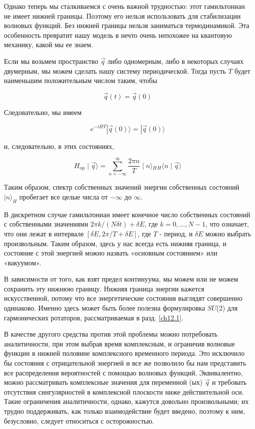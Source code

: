 \documentclass[main.tex]{subfiles}
\begin{document}
Однако теперь мы сталкиваемся с очень важной трудностью: этот гамильтониан не имеет нижней границы. Поэтому его нельзя использовать для стабилизации волновых функций. Без нижней границы нельзя заниматься термодинамикой. Эта особенность превратит нашу модель в нечто очень непохожее на квантовую механику, какой мы ее знаем.

Если мы возьмем пространство $\vec q$ либо одномерным, либо в некоторых случаях двумерным, мы можем сделать нашу систему периодической. Тогда пусть $T$ будет наименьшим положительным числом таким, чтобы

\begin{equation}\label{12.20}
	\vec q(t) = \vec q(0)
\end{equation}

Следовательно, мы имеем

\begin{equation}\label{12.21}
	e^{-i H T}|\vec{q}(0)\rangle=|\vec{q}(0)\rangle
\end{equation}
           
и, следовательно, в этих состояниях,

\begin{equation}\label{12.22}
H_{\mathrm{op}}\mid \vec q\rangle = \sum_{n=-\infty}^{\infty} \frac{2 \pi n}{T}\mid n\rangle{_H} {_H} \langle n \mid \vec{q}\rangle
\end{equation}

Таким образом, спектр собственных значений энергии собственных состояний $\mid n\rangle_H$ пробегает все целые числа от $-\infty$ до $\infty$.

В дискретном случае гамильтониан имеет конечное число собственных состояний с собственными значениями $2\pi k / (N\delta t) + \delta E$, где $k = 0,\ldots,N - 1$, что означает, что они лежат в интервале $[\delta E, 2\pi/T + \delta E]$, где $T$ - период, и $\delta E$ можно выбрать произвольным. Таким образом, здесь у нас всегда есть нижняя граница, и состояние с этой энергией можно назвать «основным состоянием» или «вакуумом».

В зависимости от того, как взят предел континуума, мы можем или не можем сохранить эту нижнюю границу. Нижняя граница энергии кажется искусственной, потому что все энергетические состояния выглядят совершенно одинаково. Именно здесь может быть более полезна формулировка $SU$(2) для гармонических ротаторов, рассматриваемая в разд. \ref{ch12.1}.

В качестве другого средства против этой проблемы можно потребовать аналитичности, при этом выбрав время комплексным, и ограничив волновые функции в нижней половине комплексного временного периода. Это исключило бы состояния с отрицательной энергией и все же позволило бы нам представить все распределения вероятностей с помощью волновых функций. Эквивалентно, можно рассматривать комплексные значения для переменной (ых) $\vec q$ и требовать отсутствия сингулярностей в комплексной плоскости ниже действительной оси. Такие ограничения аналитичности, однако, кажутся довольно произвольными; их трудно поддерживать, как только взаимодействие будет введено, поэтому к ним, безусловно, следует относиться с осторожностью.
\end{document}
